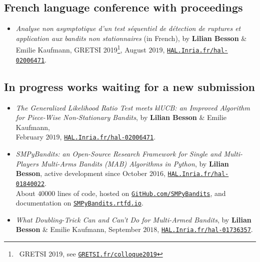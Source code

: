 \subsection{French language conference with proceedings}

\begin{itemize}
\item
    \emph{Analyse non asymptotique d'un test séquentiel de détection de ruptures et application aux bandits non stationnaires} (in French),
    by \textbf{Lilian Besson} \& Emilie Kaufmann,
    GRETSI 2019\footnote{~GRETSI 2019, see \href{http://GRETSI.fr/colloque2019}{\texttt{GRETSI.fr/colloque2019}}},
    August $2019$,
    \href{https://HAL.Inria.fr/hal-02006471}{\texttt{HAL.Inria.fr/hal-02006471}}.
    \cite{Besson2019Gretsi}

\end{itemize}


\subsection{In progress works waiting for a new submission}

\begin{itemize}

\item
    \emph{The Generalized Likelihood Ratio Test meets klUCB: an Improved Algorithm for Piece-Wise Non-Stationary Bandits},
    by \textbf{Lilian Besson} \& Emilie Kaufmann, \\
    February $2019$,
    \href{https://HAL.Inria.fr/hal-02006471}{\texttt{HAL.Inria.fr/hal-02006471}}.
    \cite{Besson2019GLRT}

\item
    \emph{SMPyBandits: an Open-Source Research Framework for Single and Multi-Players Multi-Arms Bandits (MAB) Algorithms in Python},
    by \textbf{Lilian Besson}, active development since October $2016$,
    \href{https://HAL.Inria.fr/hal-01840022}{\texttt{HAL.Inria.fr/hal-01840022}}.\\
    About $40000$ lines of code, hosted on \href{https://GitHub.com/SMPyBandits}{\texttt{GitHub.com/SMPyBandits}},
    and documentation on \href{https://SMPyBandits.rtfd.io}{\texttt{SMPyBandits.rtfd.io}}.
    \cite{SMPyBandits,SMPyBanditsJMLR}

\item
    \emph{What Doubling-Trick Can and Can't Do for Multi-Armed Bandits},
    by \textbf{Lilian Besson} \& Emilie Kaufmann,
    September $2018$,
    \href{https://HAL.Inria.fr/hal-01736357}{\texttt{HAL.Inria.fr/hal-01736357}}.
    \cite{Besson2018DoublingTricks}

\end{itemize}



